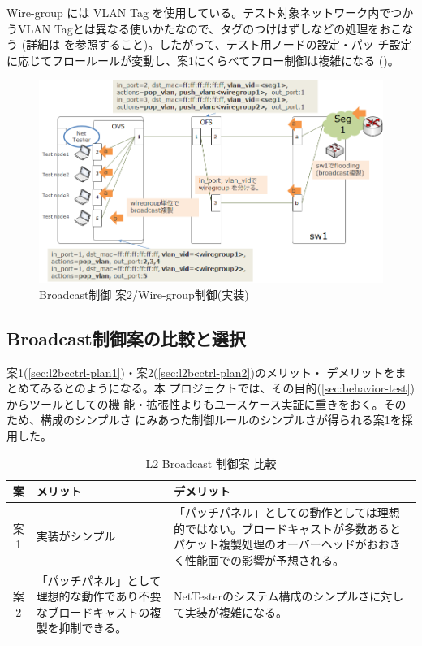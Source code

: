 Wire-group には VLAN Tag を使用している。テスト対象ネットワーク内でつか
うVLAN Tagとは異なる使いかたなので、タグのつけはずしなどの処理をおこなう
(詳細は \lopjtech を参照すること)。したがって、テスト用ノードの設定・パッ
チ設定に応じてフロールールが変動し、案1にくらべてフロー制御は複雑になる
()。

\begin{figure}[h]
 \centering
 \includegraphics[scale=0.6]{img/l2bcctrl_plan2_implement.png}
 \caption{Broadcast制御 案2/Wire-group制御(実装)}
 \label{fig:l2bcctrl_plan2_implement}
\end{figure}

  \subsection{Broadcast制御案の比較と選択}
  \label{sec:l2bcctrl-compare}

案1(\ref{sec:l2bcctrl-plan1})・案2(\ref{sec:l2bcctrl-plan2})のメリット・
デメリットをまとめてみるとのようになる。本
プロジェクトでは、その目的(\ref{sec:behavior-test})からツールとしての機
能・拡張性よりもユースケース実証に重きをおく。そのため、構成のシンプルさ
にみあった制御ルールのシンプルさが得られる案1を採用した。

\begin{table}[h]
 \caption{L2 Broadcast 制御案 比較}
 \label{tab:l2bcctrl_compare}
 \centering
 \begin{tabularx}{\linewidth}{c|X|X}
  \hline
  案 & メリット & デメリット \\ \hline
  \hline
  案1 & 実装がシンプル
      & 「パッチパネル」としての動作としては理想的ではない。ブロードキャストが多数あるとパケット複製処理のオーバーヘッドがおおきく性能面での影響が予想される。 \\ \hline
  案2 & 「パッチパネル」として理想的な動作であり不要なブロードキャストの複製を抑制できる。
      & NetTesterのシステム構成のシンプルさに対して実装が複雑になる。 \\ \hline
 \end{tabularx}
 \end{table}

